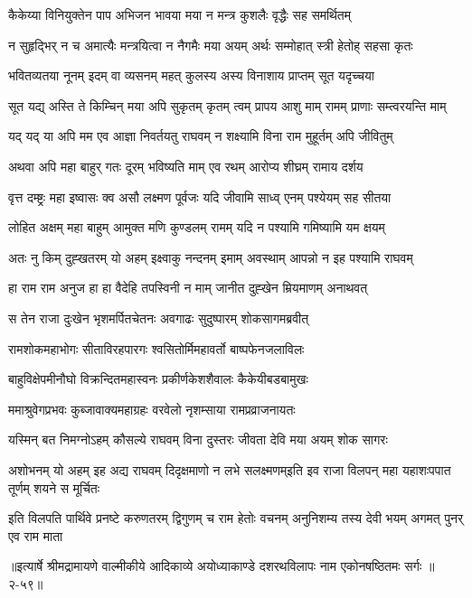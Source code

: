 \twolineshloka
{कैकेय्या विनियुक्तेन पाप अभिजन भावया}
{मया न मन्त्र कुशलैः वृद्धैः सह समर्थितम्} %

\twolineshloka
{न सुहृद्भिर् न च अमात्यैः मन्त्रयित्वा न नैगमैः}
{मया अयम् अर्थः सम्मोहात् स्त्री हेतोह् सहसा कृतः} %

\twolineshloka
{भवितव्यतया नूनम् इदम् वा व्यसनम् महत्}
{कुलस्य अस्य विनाशाय प्राप्तम् सूत यदृच्चया} %

\twolineshloka
{सूत यद्य् अस्ति ते किम्चिन् मया अपि सुकृतम् कृतम्}
{त्वम् प्रापय आशु माम् रामम् प्राणाः सम्त्वरयन्ति माम्} %

\twolineshloka
{यद् यद् या अपि मम एव आज्ञा निवर्तयतु राघवम्}
{न शक्ष्यामि विना राम मुहूर्तम् अपि जीवितुम्} %

\twolineshloka
{अथवा अपि महा बाहुर् गतः दूरम् भविष्यति}
{माम् एव रथम् आरोप्य शीघ्रम् रामाय दर्शय} %

\twolineshloka
{वृत्त दम्ष्ट्रः महा इष्वासः क्व असौ लक्ष्मण पूर्वजः}
{यदि जीवामि साध्व् एनम् पश्येयम् सह सीतया} %

\twolineshloka
{लोहित अक्षम् महा बाहुम् आमुक्त मणि कुण्डलम्}
{रामम् यदि न पश्यामि गमिष्यामि यम क्षयम्} %

\twolineshloka
{अतः नु किम् दुह्खतरम् यो अहम् इक्ष्वाकु नन्दनम्}
{इमाम् अवस्थाम् आपन्नो न इह पश्यामि राघवम्} %

\twolineshloka
{हा राम राम अनुज हा हा वैदेहि तपस्विनी}
{न माम् जानीत दुह्खेन म्रियमाणम् अनाथवत्} %

\twolineshloka
{स तेन राजा दुःखेन भृशमर्पितचेतनः}
{अवगाढः सुदुष्पारम् शोकसागमब्रवीत्} %

\twolineshloka
{रामशोकमहाभोगः सीताविरहपारगः}
{श्वसितोर्मिमहावर्तो बाष्पफेनजलाविलः} %

\twolineshloka
{बाहुविक्षेपमीनौघो विक्रन्दितमहास्वनः}
{प्रकीर्णकेशशैवालः कैकेयीबडबामुखः} %

\twolineshloka
{ममाश्रुवेगप्रभवः कुब्जावाक्यमहाग्रहः}
{वरवेलो नृशम्साया रामप्रव्राजनायतः} %

\twolineshloka
{यस्मिन् बत निमग्नोऽहम् कौसल्ये राघवम् विना}
{दुस्तरः जीवता देवि मया अयम् शोक सागरः} %

\twolineshloka
{अशोभनम् यो अहम् इह अद्य राघवम्}
{दिदृक्षमाणो न लभे सलक्ष्मणम्इति इव राजा विलपन् महा यहाशःपपात तूर्णम् शयने स मूर्चितः} %

\fourlineindentedshloka
{इति विलपति पार्थिवे प्रनष्टे}
{करुणतरम् द्विगुणम् च राम हेतोः}
{वचनम् अनुनिशम्य तस्य देवी}
{भयम् अगमत् पुनर् एव राम माता} %


॥इत्यार्षे श्रीमद्रामायणे वाल्मीकीये आदिकाव्ये अयोध्याकाण्डे दशरथविलापः नाम एकोनषष्ठितमः सर्गः ॥२-५९॥
